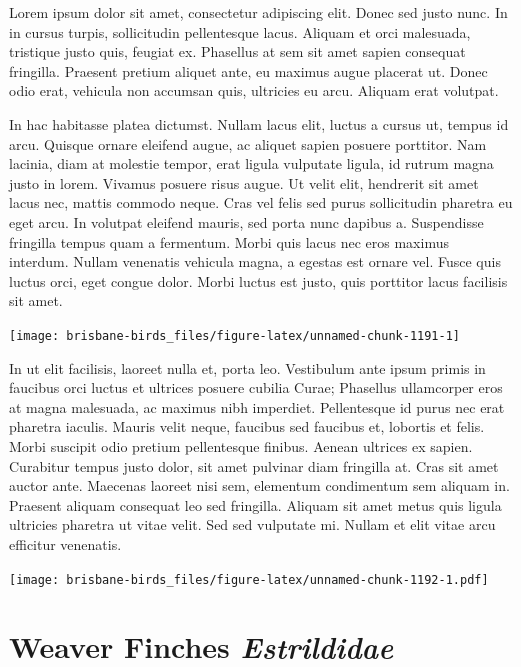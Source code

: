 \documentclass[]{book}
\let\origfigure\figure
\let\endorigfigure\endfigure
\renewenvironment{figure}[1][2] {
  \expandafter\origfigure\expandafter[H]
} {
  \endorigfigure
}
\begin{document}
Lorem ipsum dolor sit amet, consectetur adipiscing elit. Donec sed justo
nunc. In in cursus turpis, sollicitudin pellentesque lacus. Aliquam et
orci malesuada, tristique justo quis, feugiat ex. Phasellus at sem sit
amet sapien consequat fringilla. Praesent pretium aliquet ante, eu
maximus augue placerat ut. Donec odio erat, vehicula non accumsan quis,
ultricies eu arcu. Aliquam erat volutpat.

In hac habitasse platea dictumst. Nullam lacus elit, luctus a cursus ut,
tempus id arcu. Quisque ornare eleifend augue, ac aliquet sapien posuere
porttitor. Nam lacinia, diam at molestie tempor, erat ligula vulputate
ligula, id rutrum magna justo in lorem. Vivamus posuere risus augue. Ut
velit elit, hendrerit sit amet lacus nec, mattis commodo neque. Cras vel
felis sed purus sollicitudin pharetra eu eget arcu. In volutpat eleifend
mauris, sed porta nunc dapibus a. Suspendisse fringilla tempus quam a
fermentum. Morbi quis lacus nec eros maximus interdum. Nullam venenatis
vehicula magna, a egestas est ornare vel. Fusce quis luctus orci, eget
congue dolor. Morbi luctus est justo, quis porttitor lacus facilisis sit
amet.

\begin{figure}
\texttt{[image: brisbane-birds\_files/figure-latex/unnamed-chunk-1191-1]} \caption{insert figure caption}\label{fig:unnamed-chunk-1191}
\end{figure}

In ut elit facilisis, laoreet nulla et, porta leo. Vestibulum ante ipsum
primis in faucibus orci luctus et ultrices posuere cubilia Curae;
Phasellus ullamcorper eros at magna malesuada, ac maximus nibh
imperdiet. Pellentesque id purus nec erat pharetra iaculis. Mauris velit
neque, faucibus sed faucibus et, lobortis et felis. Morbi suscipit odio
pretium pellentesque finibus. Aenean ultrices ex sapien. Curabitur
tempus justo dolor, sit amet pulvinar diam fringilla at. Cras sit amet
auctor ante. Maecenas laoreet nisi sem, elementum condimentum sem
aliquam in. Praesent aliquam consequat leo sed fringilla. Aliquam sit
amet metus quis ligula ultricies pharetra ut vitae velit. Sed sed
vulputate mi. Nullam et elit vitae arcu efficitur venenatis.

\begin{figure}
\centering
\texttt{[image: brisbane-birds\_files/figure-latex/unnamed-chunk-1192-1.pdf]}
\caption{\label{fig:unnamed-chunk-1192}insert figure caption}
\end{figure}

\chapter{\texorpdfstring{Weaver Finches
\emph{Estrildidae}}{Weaver Finches Estrildidae}}\label{weaver-finches-estrildidae}
\end{document}

